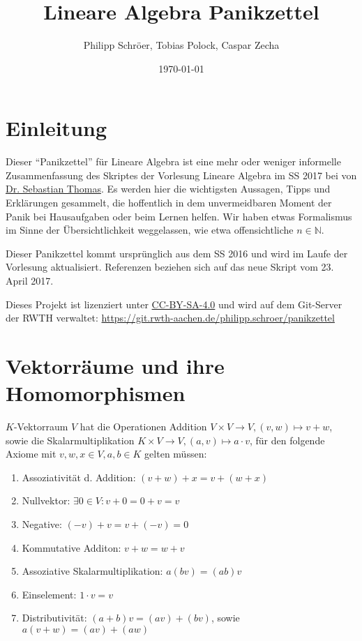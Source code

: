 \documentclass[a4paper,parskip=half*,DIV=15,fontsize=11pt]{scrartcl}
\title{Lineare Algebra Panikzettel}
\author{Philipp Schröer, Tobias Polock, Caspar Zecha}
\date{\today}
\begin{document}
\maketitle

\setcounter{tocdepth}{2}
\tableofcontents

\section{Einleitung}

Dieser ``Panikzettel'' für Lineare Algebra ist eine mehr oder weniger informelle Zusammenfassung des Skriptes der Vorlesung Lineare Algebra im SS 2017 bei von \href{http://www.math.rwth-aachen.de/~Sebastian.Thomas/photo.jpg}{Dr. Sebastian Thomas}. Es werden hier die wichtigsten Aussagen, Tipps und Erklärungen gesammelt, die hoffentlich in dem unvermeidbaren Moment der Panik bei Hausaufgaben oder beim Lernen helfen. Wir haben etwas Formalismus im Sinne der Übersichtlichkeit weggelassen, wie etwa offensichtliche $n \in \mathbb{N}$.

Dieser Panikzettel kommt ursprünglich aus dem SS 2016 und wird im Laufe der Vorlesung aktualisiert. Referenzen beziehen sich auf das neue Skript vom 23. April 2017.

Dieses Projekt ist lizenziert unter \href{https://creativecommons.org/licenses/by-sa/4.0/}{CC-BY-SA-4.0} und wird auf dem Git-Server der RWTH verwaltet: \url{https://git.rwth-aachen.de/philipp.schroer/panikzettel}

\section{Vektorräume und ihre Homomorphismen}

$K$-Vektorraum $V$ hat die Operationen Addition  $V \times V \to V, (v,w) \mapsto v+w$, sowie die Skalarmultiplikation $K \times V \to V, (a,v) \mapsto a \cdot v  $, für den folgende Axiome mit $v, w, x \in V, a,b \in K$ gelten müssen:

\begin{enumerate}
\item Assoziativität d. Addition: $(v+w)+x = v+(w+x)$
\item Nullvektor: $\exists 0 \in V: v+0=0+v=v$
\item Negative: $(-v)+v=v+(-v)=0$
\item Kommutative Additon: $v+w=w+v$
\item Assoziative Skalarmultiplikation: $a(bv)=(ab)v$
\item Einselement: $1\cdot v=v$
\item Distributivität: $(a+b)v=(av)+(bv)$, sowie $a(v+w)=(av)+(aw)$
\end{enumerate}
\end{document}
